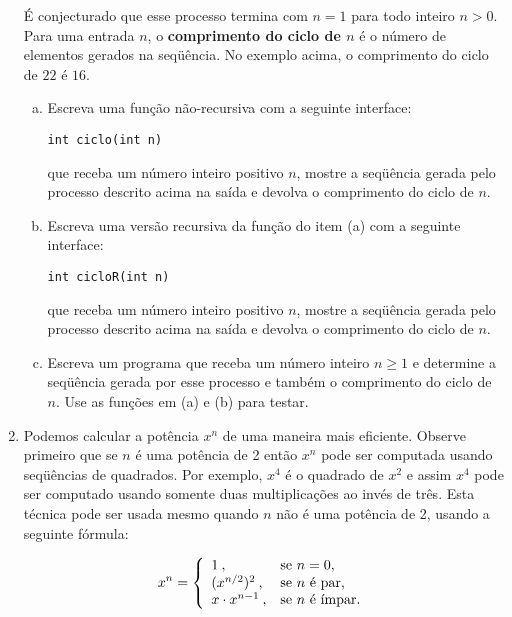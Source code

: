 \documentclass[a4paper,10pt]{article}
\begin{document}
\begin{enumerate}
É conjecturado que esse processo termina com $n = 1$ para todo inteiro $n > 0$.
Para uma entrada $n$, o \textbf{comprimento do ciclo de $n$} é o número de elementos gerados na seqüência.
No exemplo acima, o comprimento do ciclo de $22$ é $16$. 

\begin{enumerate}[(a)]
  \item Escreva uma função não-recursiva com a seguinte interface:

\begin{lstlisting}
int ciclo(int n)
\end{lstlisting}

que receba um número inteiro positivo $n$, mostre a seqüência gerada pelo processo descrito acima 
na saída e devolva o comprimento do ciclo de $n$. 

\item Escreva uma versão recursiva da função do item (a) com a seguinte interface: 

\begin{lstlisting}
int cicloR(int n)
\end{lstlisting}

que receba um número inteiro positivo $n$, mostre a seqüência gerada pelo processo descrito 
acima na saída e devolva o comprimento do ciclo de $n$. 

\item Escreva um programa que receba um número inteiro $n \geq 1$ e determine a seqüência gerada 
por esse processo e também o comprimento do ciclo de $n$. Use as funções em (a) e (b) para testar. 
\end{enumerate}


\item Podemos calcular a potência $x^n$ de uma maneira mais eficiente.
Observe primeiro que se $n$ é uma potência de 2 então $x^n$ pode ser computada usando seqüências de quadrados.
Por exemplo, $x^4$ é o quadrado de $x^2$ e assim $x^4$ pode ser computado usando somente duas multiplicações 
ao invés de três. Esta técnica pode ser usada mesmo quando $n$ não é uma potência de 2, usando a seguinte fórmula:


\[    x^n = \left \{ \begin{array}{ll}
        1\:, & \textnormal{se $n = 0$,} \\
        (x^{n/2})^2\:, & \textnormal{se $n$ é par,} \\
        x \cdot x^{n-1}\:, & \textnormal{se $n$ é ímpar.}
      \end{array} \right. \]


\end{enumerate}
\end{document}

